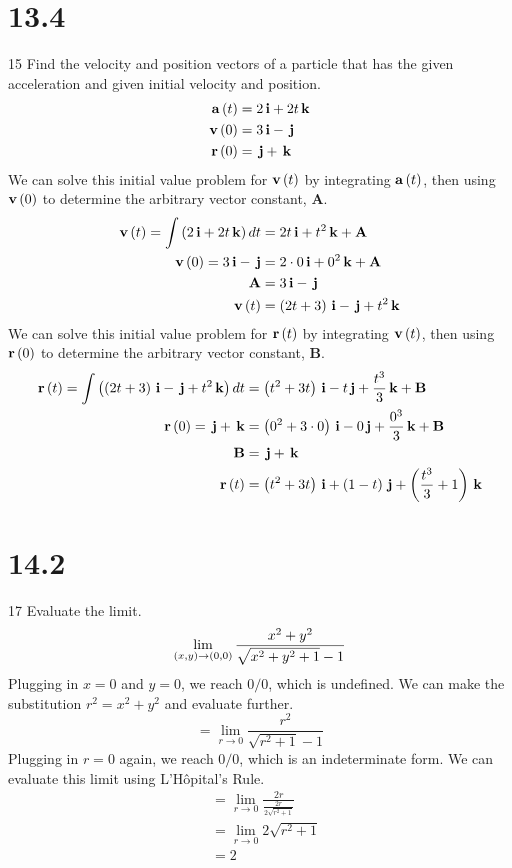 \documentclass[12pt]{article}
\begin{document}
\section{13.4}{15}
Find the velocity and position vectors of a particle that has the given acceleration and given initial velocity and position.
%
\begin{align*}
\mathbf{a}\left({t}\right)&=2\,\mathbf{i}+2t\,\mathbf{k}\\
\mathbf{v}\left({0}\right)&=3\,\mathbf{i}-\,\mathbf{j}\\
\mathbf{r}\left({0}\right)&=\,\mathbf{j}+\,\mathbf{k}
\end{align*}
%
We can solve this initial value problem for $\mathbf{v}\left({t}\right)$ by integrating $\mathbf{a}\left({t}\right)$, then
using $\mathbf{v}\left({0}\right)$ to determine the arbitrary vector constant, $\mathbf{A}$.
%
\begin{align*}
\mathbf{v}\left({t}\right)=\int\left({2\,\mathbf{i}+2t\,\mathbf{k}}\right)dt&=2t\,\mathbf{i}+t^2\,\mathbf{k}+\mathbf{A}\\
\mathbf{v}\left({0}\right)=3\,\mathbf{i}-\,\mathbf{j}&=2\cdot0\,\mathbf{i}+0^2\,\mathbf{k}+\mathbf{A}\\
\mathbf{A}&=3\,\mathbf{i}-\,\mathbf{j}\\
\mathbf{v}\left({t}\right)&=\left({2t+3}\right)\,\mathbf{i}-\,\mathbf{j}+t^2\,\mathbf{k}
\end{align*}
%
We can solve this initial value problem for $\mathbf{r}\left({t}\right)$ by integrating $\mathbf{v}\left({t}\right)$, then
using $\mathbf{r}\left({0}\right)$ to determine the arbitrary vector constant, $\mathbf{B}$.
%
\begin{align*}
\mathbf{r}\left({t}\right)=\int\left({\left({2t+3}\right)\,\mathbf{i}-\,\mathbf{j}+t^2\,\mathbf{k}}\right)dt&=\left({t^2+3t}\right)\,\mathbf{i}-t\,\mathbf{j}+\frac{t^3}{3}\,\mathbf{k}+\mathbf{B}\\
\mathbf{r}\left({0}\right)=\,\mathbf{j}+\,\mathbf{k}&=\left({0^2+3\cdot{0}}\right)\,\mathbf{i}-0\,\mathbf{j}+\frac{0^3}{3}\,\mathbf{k}+\mathbf{B}\\
\mathbf{B}&=\,\mathbf{j}+\,\mathbf{k}\\
\mathbf{r}\left({t}\right)&=\left({t^2+3t}\right)\,\mathbf{i}+\left({1-t}\right)\,\mathbf{j}+\left({\frac{t^3}{3}+1}\right)\,\mathbf{k}
\end{align*}

\section{14.2}{17}
Evaluate the limit.
%
\begin{equation*}
\lim_{\left({x,y}\right)\to\left({0,0}\right)}\frac{x^2+y^2}{\sqrt{x^2+y^2+1}-1}
\end{equation*}
%
Plugging in $x=0$ and $y=0$, we reach $0/0$, which is undefined. We can make the substitution $r^2=x^2+y^2$ and evaluate
further.
%
\begin{equation*}
=\lim_{r\to{0}}\frac{r^2}{\sqrt{r^2+1}-1}
\end{equation*}
%
Plugging in $r=0$ again, we reach $0/0$, which is an indeterminate form. We can evaluate this limit using L'H\^{o}pital's Rule.
%
\begin{align*}
&=\lim_{r\to{0}}\frac{2r}{\frac{2r}{2\sqrt{r^2+1}}}\\
&=\lim_{r\to{0}}2\sqrt{r^2+1}\\
&=2
\end{align*}
\end{document}
